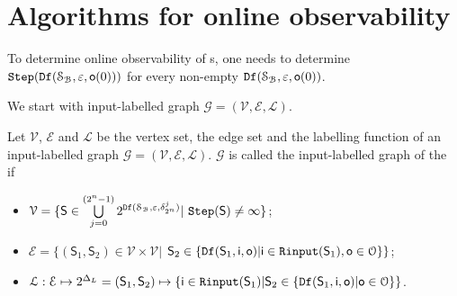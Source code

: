 
\section{Algorithms for online observability}
\label{sec:deter}
To  determine  online observability of \BCN s, one needs to determine ${\tt Step}({\tt Df}(\mathcal{S}_{\mathcal{B}},\varepsilon,\mathsf{o}(0)))$ for every non-empty ${\tt Df}(\mathcal{S}_{\mathcal{B}},\varepsilon, \mathsf{o}(0))$. 

We start with input-labelled graph $\mathcal{G}=(\mathcal{V}, \mathcal{E}, \mathcal{L})$.

\begin{definition}
Let $\mathcal{V}$, $\mathcal{E}$ and $\mathcal{L}$ be the vertex set, the edge set and the labelling function of an input-labelled graph $\mathcal{G}=(\mathcal{V}, \mathcal{E}, \mathcal{L})$. $\mathcal{G}$ is called the input-labelled graph of the \BCN\, if 
\begin{itemize}
\item  $\mathcal{V}=\{\mathsf{S}\in\bigcup\limits_{j=0}^{(2^{n} -1)} 2^{\Ded(\mathcal{S}_\BB,\varepsilon,\delta^j_{2^{n}} )}|\ \Ks(\mathsf{S})\ne \infty\}$;
\item  $\mathcal{E}=\{(\mathsf{S}_1,\mathsf{S}_2)\in \mathcal{V}\times \mathcal{V}|$ $\mathsf{S}_2\in\{{\tt Df}(\mathsf{S}_1,\mathsf{i},\mathsf{o})|\mathsf{i}\in{\tt Rinput}(\mathsf{S}_1),\mathsf{o}\in  \mathcal{O}\}\}$;
\item  $\mathcal{L}:\mathcal{E}\mapsto 2^{\Delta_L}=(\mathsf{S}_1,\mathsf{S}_2)\mapsto\{\mathsf{i}\in {\tt Rinput}(\mathsf{S}_1)|\mathsf{S}_2\in\{{\tt Df}(\mathsf{S}_1,\mathsf{i},\mathsf{o})|\mathsf{o}\in  \mathcal{O}\}\}$.
 \end{itemize}
\end{definition}

